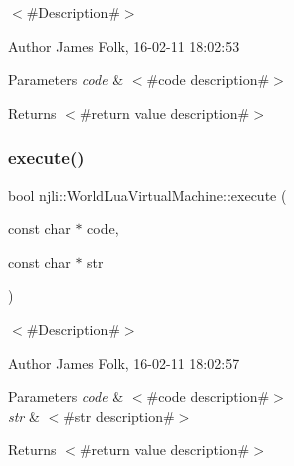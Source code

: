 $<$\#\+Description\#$>$ 

\begin{DoxyAuthor}{Author}
James Folk, 16-\/02-\/11 18\+:02\+:53
\end{DoxyAuthor}

\begin{DoxyParams}{Parameters}
{\em code} & $<$\#code description\#$>$\\
\hline
\end{DoxyParams}
\begin{DoxyReturn}{Returns}
$<$\#return value description\#$>$ 
\end{DoxyReturn}
\mbox{\label{classnjli_1_1_world_lua_virtual_machine_af9efb7780458024e60c886b5c30cc594}} 
\subsubsection{\texorpdfstring{execute()}{execute()}\hspace{0.1cm}{\footnotesize\ttfamily [2/33]}}
{\footnotesize\ttfamily bool njli\+::\+World\+Lua\+Virtual\+Machine\+::execute (\begin{DoxyParamCaption}\item[{const char $\ast$}]{code,  }\item[{const char $\ast$}]{str }\end{DoxyParamCaption})}



$<$\#\+Description\#$>$ 

\begin{DoxyAuthor}{Author}
James Folk, 16-\/02-\/11 18\+:02\+:57
\end{DoxyAuthor}

\begin{DoxyParams}{Parameters}
{\em code} & $<$\#code description\#$>$ \\
\hline
{\em str} & $<$\#str description\#$>$\\
\hline
\end{DoxyParams}
\begin{DoxyReturn}{Returns}
$<$\#return value description\#$>$ 
\end{DoxyReturn}
\mbox{\label{classnjli_1_1_world_lua_virtual_machine_a1e20adef1ec977bc52e3343320ac7ff6}} 
